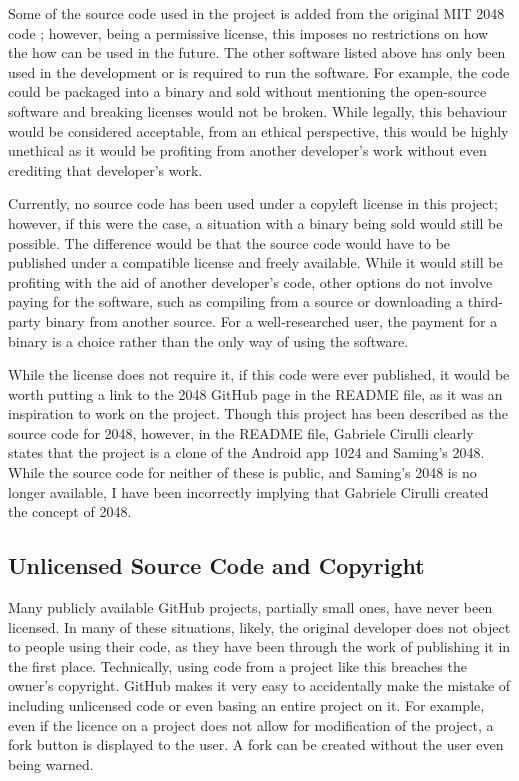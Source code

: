 \documentclass{article}
\begin{document}
Some of the source code used in the project is added from the original MIT 2048 code \cite{game2048}; however, being a permissive license, this imposes no restrictions on how the how can be used in the future. The other software listed above has only been used in the development or is required to run the software. For example, the code could be packaged into a binary and sold without mentioning the open-source software and  breaking licenses would not be broken. While legally, this behaviour would be considered acceptable, from an ethical perspective, this would be highly unethical as it would be profiting from another developer's work without even crediting that developer's work.

Currently, no source code has been used under a copyleft license in this project; however, if this were the case, a situation with a binary being sold would still be possible. The difference would be that the source code would have to be published under a compatible license and freely available. While it would still be profiting with the aid of another developer's code, other options do not involve paying for the software, such as compiling from a source or downloading a third-party binary from another source. For a well-researched user, the payment for a binary is a choice rather than the only way of using the software.

While the license does not require it, if this code were ever published, it would be worth putting a link to the 2048 GitHub page \cite{game2048} in the README file, as it was an inspiration to work on the project. Though this project \cite{game2048} has been described as the source code for 2048, however, in the README file, Gabriele Cirulli clearly states that the project is a clone of the Android app 1024 and Saming's 2048. While the source code for neither of these is public, and Saming's 2048 is no longer available, I have been incorrectly implying that Gabriele Cirulli created the concept of 2048.

\subsection{Unlicensed Source Code and Copyright}
Many publicly available GitHub projects, partially small ones, have never been licensed. In many of these situations, likely, the original developer does not object to people using their code, as they have been through the work of publishing it in the first place. Technically, using code from a project like this breaches the owner's copyright. GitHub makes it very easy to accidentally make the mistake of including unlicensed code or even basing an entire project on it. For example, even if the licence on a project does not allow for modification of the project, a fork button is displayed to the user. A fork can be created without the user even being warned.
\end{document}
